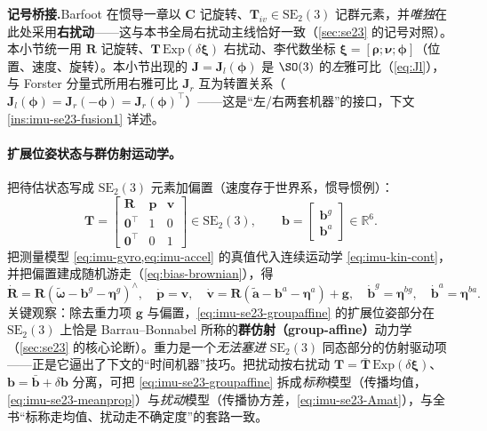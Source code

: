 \begin{note}
\textbf{记号桥接.}\;Barfoot 在惯导一章以 $\mathbf C$ 记旋转、$\mathbf T_{iv}\in\mathrm{SE}_2(3)$ 记群元素，并\emph{唯独}在此处采用\textbf{右扰动}——这与本书全局右扰动主线恰好一致（\cref{sec:se23} 的记号对照）。本小节统一用 $\mathbf R$ 记旋转、$\mathbf T\,\mathrm{Exp}(\delta\boldsymbol\xi)$ 右扰动、李代数坐标 $\boldsymbol\xi=[\boldsymbol\rho;\boldsymbol\nu;\boldsymbol\phi]$（位置、速度、旋转）。本小节出现的 $\mathbf J=\mathbf J_l(\boldsymbol\phi)$ 是 $\SO(3)$ 的\emph{左}雅可比（\cref{eq:Jl}），与 Forster 分量式所用右雅可比 $\mathbf J_r$ 互为转置关系（$\mathbf J_l(\boldsymbol\phi)=\mathbf J_r(-\boldsymbol\phi)=\mathbf J_r(\boldsymbol\phi)^\top$）——这是“左/右两套机器”的接口，下文 \cref{ins:imu-se23-fusion1} 详述。
\end{note}

\paragraph{扩展位姿状态与群仿射运动学。}
把待估状态写成 $\mathrm{SE}_2(3)$ 元素加偏置（速度存于世界系，惯导惯例）：
\begin{equation}
  \mathbf T=\begin{bmatrix}\mathbf R&\mathbf p&\mathbf v\\\mathbf 0^\top&1&0\\\mathbf 0^\top&0&1\end{bmatrix}\in\mathrm{SE}_2(3),
  \qquad \mathbf b=\begin{bmatrix}\mathbf b^g\\\mathbf b^a\end{bmatrix}\in\mathbb R^6.
  \label{eq:imu-se23-state}
\end{equation}
把测量模型 \cref{eq:imu-gyro,eq:imu-accel} 的真值代入连续运动学 \cref{eq:imu-kin-cont}，并把偏置建成随机游走（\cref{eq:bias-brownian}），得\cite{barfoot2024state}
\begin{equation}
  \dot{\mathbf R}=\mathbf R(\tilde{\boldsymbol\omega}-\mathbf b^g-\boldsymbol\eta^g)^\wedge,\quad
  \dot{\mathbf p}=\mathbf v,\quad
  \dot{\mathbf v}=\mathbf R(\tilde{\mathbf a}-\mathbf b^a-\boldsymbol\eta^a)+\mathbf g,\quad
  \dot{\mathbf b}^g=\boldsymbol\eta^{bg},\quad \dot{\mathbf b}^a=\boldsymbol\eta^{ba}.
  \label{eq:imu-se23-groupaffine}
\end{equation}
关键观察：除去重力项 $\mathbf g$ 与偏置，\cref{eq:imu-se23-groupaffine} 的扩展位姿部分在 $\mathrm{SE}_2(3)$ 上恰是 Barrau--Bonnabel 所称的\textbf{群仿射（group-affine）}动力学（\cref{sec:se23} 的核心论断）。重力是一个\emph{无法塞进} $\mathrm{SE}_2(3)$ 同态部分的仿射驱动项——正是它逼出了下文的“时间机器”技巧。把扰动按右扰动 $\mathbf T=\bar{\mathbf T}\,\mathrm{Exp}(\delta\boldsymbol\xi)$、$\mathbf b=\bar{\mathbf b}+\delta\mathbf b$ 分离，可把 \cref{eq:imu-se23-groupaffine} 拆成\emph{标称}模型（传播均值，\cref{eq:imu-se23-meanprop}）与\emph{扰动}模型（传播协方差，\cref{eq:imu-se23-Amat}），与全书“标称走均值、扰动走不确定度”的套路一致。

